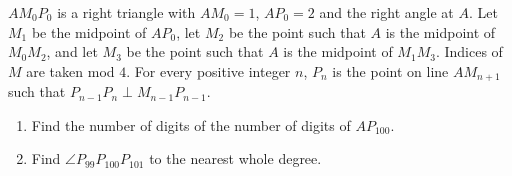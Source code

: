 $AM_0P_0$ is a right triangle with $AM_0=1$, $AP_0=2$ and the right angle at $A$. Let $M_1$ be the midpoint of $AP_0$, let $M_2$ be the point such that $A$ is the midpoint of $M_0M_2$, and let $M_3$ be the point such that $A$ is the midpoint of $M_1M_3$. Indices of $M$ are taken mod $4$. For every positive integer $n$, $P_n$ is the point on line $AM_{n+1}$ such that $P_{n-1}P_n\perp M_{n-1}P_{n-1}$.
\begin{enumerate}
\item[(a)] Find the number of digits of the number of digits of $AP_{100}$.
\item[(b)] Find $\angle P_{99}P_{100}P_{101}$ to the nearest whole degree.
\end{enumerate}
